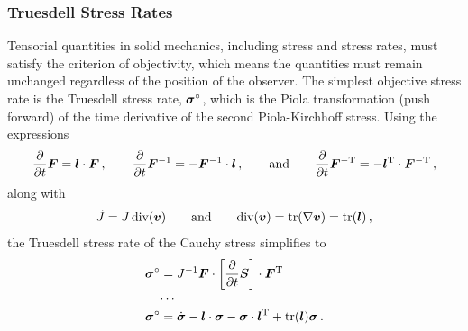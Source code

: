 \documentclass[10pt,letterpaper,oneside]{report}
\newcommand{\ten}[1]{\mbox{\boldmath $#1$}{}}
\newcommand{\scas}[1]{\mbox{{\scriptsize{${\rm{#1}}$}}}{}}
\begin{document}
\subsubsection{Truesdell Stress Rates}
Tensorial quantities in solid mechanics, including stress and stress rates, must satisfy the criterion of objectivity, which means the quantities must remain unchanged regardless of the position of the observer.  The simplest objective stress rate is the Truesdell stress rate, $\ten{\sigma}^{\circ}$, which is the Piola transformation (push forward) of the time derivative of the second Piola-Kirchhoff stress.  Using the expressions 
\begin{equation}
\frac{\partial }{\partial t} \ten{F} = \ten{l} \cdot \ten{F} \, , 
\qquad  
\frac{\partial }{\partial t} \ten{F}^{-1} = - \ten{F}^{-1} \cdot \ten{l} \, , 
\qquad \mbox{and} \qquad
\frac{\partial }{\partial t} \ten{F}^{-\scas{T}} = - \ten{l}^{\scas{T}} \cdot \ten{F}^{-\scas{T}} \, , 
\end{equation}
along with
\begin{equation}
\dot{J} = J \, \mbox{div} (\ten{v}) 
\qquad \mbox{and} \qquad 
\mbox{div} (\ten{v}) = \mbox{tr} (\nabla \ten{v} ) = \mbox{tr} (\ten{l}) \, , 
\end{equation}
the Truesdell stress rate of the Cauchy stress simplifies to
\begin{align}
\ten{\sigma}^{\circ } ={}& J^{-1} \ten{F} \cdot \left[ \frac{\partial }{\partial t} \ten{S} \right] \cdot \ten{F}^{\scas{T}}
\\
\cdots{}& \notag \\
\ten{\sigma}^{\circ } 
={}& \dot{\ten{\sigma}} -  \ten{l} \cdot  \ten{\sigma} -  \ten{\sigma} \cdot \ten{l}^{\scas{T}} + \mbox{tr} (\ten{l}) \ten{\sigma} \, .
\end{align}
\end{document}
